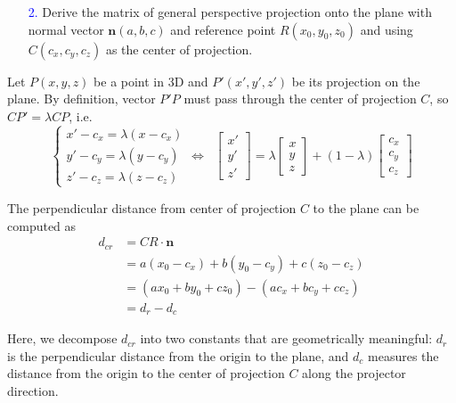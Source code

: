 \documentclass[11pt]{article}  %
\begin{document}
    \begin{enumerate}[leftmargin=*]
        \item[\textcolor{blue}{2.}] Derive the matrix of general perspective projection onto the plane with normal vector $\bm{n}(a,b,c)$ and reference point $R(x_0,y_0,z_0)$ and using $C(c_x,c_y,c_z)$ as the center of projection.
    \end{enumerate}
    
    \solution
    
    Let $P(x,y,z)$ be a point in 3D and $P'(x',y',z')$ be its projection on the plane. By definition, vector $P'P$ must pass through the center of projection $C$, so $CP'=\lambda CP$, i.e.
    \begin{equation}
        \begin{cases}
            x'-c_x = \lambda (x-c_x)\\
            y'-c_y = \lambda (y-c_y)\\
            z'-c_z = \lambda (z-c_z)
        \end{cases}
        \Leftrightarrow \;\;\label{eq:1}
        \begin{bmatrix}
            x'\\y'\\z'
        \end{bmatrix}
        =\lambda
        \begin{bmatrix}
            x\\y\\z
        \end{bmatrix}
        +(1-\lambda)
        \begin{bmatrix}
            c_x\\c_y\\c_z
        \end{bmatrix}
    \end{equation}
    
    The perpendicular distance from center of projection $C$ to the plane can be computed as
    \begin{align*}
        d_{cr} &= CR \cdot \bm{n}\\
        &= a(x_0-c_x)+b(y_0-c_y)+c(z_0-c_z)\\
        &= (ax_0+by_0+cz_0)-(ac_x+bc_y+cc_z)\\
        &= d_r-d_c
    \end{align*}
    
    Here, we decompose $d_{cr}$ into two constants that are geometrically meaningful: $d_r$ is the perpendicular distance from the origin to the plane, and $d_c$ measures the distance from the origin to the center of projection $C$ along the projector direction.\vspace{3mm}
    
\end{document}
